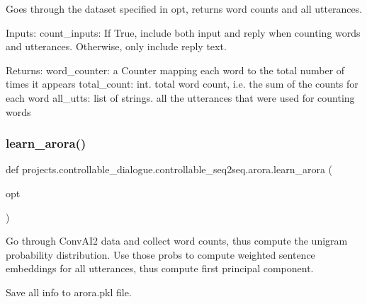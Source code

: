 \begin{DoxyVerb}Goes through the dataset specified in opt, returns word counts and all utterances.

Inputs:
  count_inputs: If True, include both input and reply when counting words and
    utterances. Otherwise, only include reply text.

Returns:
  word_counter: a Counter mapping each word to the total number of times it appears
  total_count: int. total word count, i.e. the sum of the counts for each word
  all_utts: list of strings. all the utterances that were used for counting words
\end{DoxyVerb}
 \mbox{\label{namespaceprojects_1_1controllable__dialogue_1_1controllable__seq2seq_1_1arora_a4fba2bc46a41b5255407e76ca52e0398}} 
\subsubsection{\texorpdfstring{learn\+\_\+arora()}{learn\_arora()}}
{\footnotesize\ttfamily def projects.\+controllable\+\_\+dialogue.\+controllable\+\_\+seq2seq.\+arora.\+learn\+\_\+arora (\begin{DoxyParamCaption}\item[{}]{opt }\end{DoxyParamCaption})}

\begin{DoxyVerb}Go through ConvAI2 data and collect word counts, thus compute the unigram
probability distribution. Use those probs to compute weighted sentence embeddings
for all utterances, thus compute first principal component.

Save all info to arora.pkl file.
\end{DoxyVerb}
 \mbox{\label{namespaceprojects_1_1controllable__dialogue_1_1controllable__seq2seq_1_1arora_aaea3eb10fd28246497bb20a148a26da8}} 
